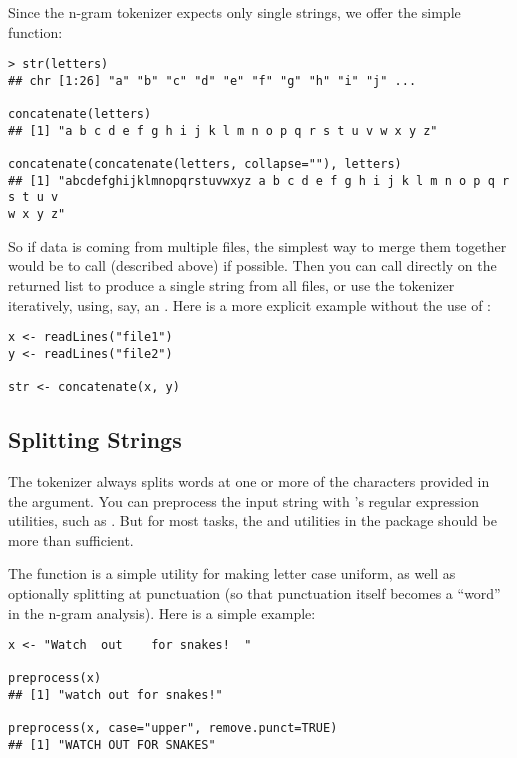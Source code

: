 Since the n-gram tokenizer expects only single strings, we offer the simple
 function:

\begin{lstlisting}[language=rr]
> str(letters)
## chr [1:26] "a" "b" "c" "d" "e" "f" "g" "h" "i" "j" ...

concatenate(letters)
## [1] "a b c d e f g h i j k l m n o p q r s t u v w x y z"

concatenate(concatenate(letters, collapse=""), letters)
## [1] "abcdefghijklmnopqrstuvwxyz a b c d e f g h i j k l m n o p q r s t u v 
w x y z"
\end{lstlisting}

So if data is coming from multiple files, the simplest way to merge them 
together would be to call  (described above) if possible.
Then you can call  directly on the returned list to produce
a single string from all files, or use the tokenizer iteratively, using, say, an
.  Here is a more explicit example without the use of
:

\begin{lstlisting}[language=rr]
x <- readLines("file1")
y <- readLines("file2")

str <- concatenate(x, y)
\end{lstlisting}



\subsection{Splitting Strings}

The  tokenizer always splits words at one or more of the characters
provided in the  argument. You can preprocess the input string with
\R's regular expression utilities, such as .  But for most tasks,
the  and  utilities in the \thispackage
package should be more than sufficient.


The  function is a simple utility for making letter case
uniform, as well as optionally splitting at punctuation (so that punctuation
itself becomes a ``word'' in the n-gram analysis).  Here is a simple example:

\begin{lstlisting}[language=rr]
x <- "Watch  out    for snakes!  "
 
preprocess(x)
## [1] "watch out for snakes!"
 
preprocess(x, case="upper", remove.punct=TRUE)
## [1] "WATCH OUT FOR SNAKES"
\end{lstlisting}

